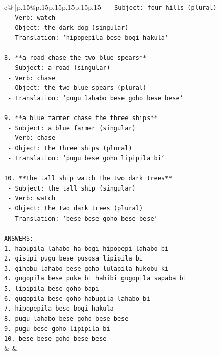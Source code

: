 \documentclass{article}
\begin{document}
{\begin{supertabular}{c@{$\;$}|p{.15\linewidth}@{}p{.15\linewidth}p{.15\linewidth}p{.15\linewidth}p{.15\linewidth}p{.15\linewidth}}
{{{\texttt{   {-} Subject: four hills (plural)} \\
\texttt{   {-} Verb: watch} \\
\texttt{   {-} Object: the dark dog (singular)} \\
\texttt{   {-} Translation: `hipopepila bese bogi hakula`} \\
\\ 
\texttt{8. **a road chase the two blue spears**} \\
\texttt{   {-} Subject: a road (singular)} \\
\texttt{   {-} Verb: chase} \\
\texttt{   {-} Object: the two blue spears (plural)} \\
\texttt{   {-} Translation: `pugu lahabo bese goho bese bese`} \\
\\ 
\texttt{9. **a blue farmer chase the three ships**} \\
\texttt{   {-} Subject: a blue farmer (singular)} \\
\texttt{   {-} Verb: chase} \\
\texttt{   {-} Object: the three ships (plural)} \\
\texttt{   {-} Translation: `pugu bese goho lipipila bi`} \\
\\ 
\texttt{10. **the tall ship watch the two dark trees**} \\
\texttt{    {-} Subject: the tall ship (singular)} \\
\texttt{    {-} Verb: watch} \\
\texttt{    {-} Object: the two dark trees (plural)} \\
\texttt{    {-} Translation: `bese bese goho bese bese`} \\
\\ 
\texttt{ANSWERS:} \\
\texttt{1. habupila lahabo ha bogi hipopepi lahabo bi} \\
\texttt{2. gisipi pugu bese pusosa lipipila bi} \\
\texttt{3. gihobu lahabo bese goho lulapila hukobu ki} \\
\texttt{4. gugopila bese puke bi hahibi gugopila sapaba bi} \\
\texttt{5. lipipila bese goho bapi} \\
\texttt{6. gugopila bese goho habupila lahabo bi} \\
\texttt{7. hipopepila bese bogi hakula} \\
\texttt{8. pugu lahabo bese goho bese bese} \\
\texttt{9. pugu bese goho lipipila bi} \\
\texttt{10. bese bese goho bese bese} \\
            }
        }
    }
    & & \\ \\


\end{supertabular}}
\end{document}
